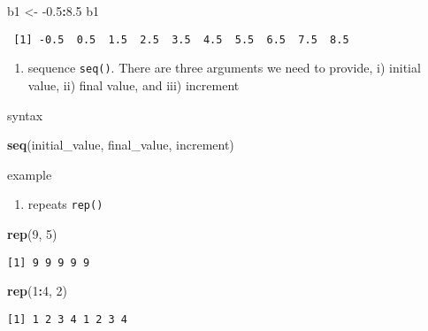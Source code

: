 \documentclass[
]{book}
\newenvironment{Shaded}{\begin{snugshade}}{\end{snugshade}}
\newcommand{\DecValTok}[1]{\textcolor[rgb]{0.00,0.00,0.81}{#1}}
\newcommand{\FloatTok}[1]{\textcolor[rgb]{0.00,0.00,0.81}{#1}}
\newcommand{\KeywordTok}[1]{\textcolor[rgb]{0.13,0.29,0.53}{\textbf{#1}}}
\newcommand{\NormalTok}[1]{#1}
\newcommand{\OperatorTok}[1]{\textcolor[rgb]{0.81,0.36,0.00}{\textbf{#1}}}
\newcommand{\StringTok}[1]{\textcolor[rgb]{0.31,0.60,0.02}{#1}}
\providecommand{\tightlist}{%
  \setlength{\itemsep}{0pt}\setlength{\parskip}{0pt}}
\begin{document}
\begin{Shaded}
\begin{Highlighting}[]
\NormalTok{b1 <-}\StringTok{ }\FloatTok{-0.5}\OperatorTok{:}\FloatTok{8.5}
\NormalTok{b1}
\end{Highlighting}
\end{Shaded}

\begin{verbatim}
 [1] -0.5  0.5  1.5  2.5  3.5  4.5  5.5  6.5  7.5  8.5
\end{verbatim}

\begin{enumerate}
\def\labelenumi{\arabic{enumi}.}
\setcounter{enumi}{1}
\tightlist
\item
  sequence \texttt{seq()}. There are three arguments we need to provide, i) initial value, ii) final value, and iii) increment
\end{enumerate}

syntax

\begin{Shaded}
\begin{Highlighting}[]
\KeywordTok{seq}\NormalTok{(initial_value, final_value, increment)}
\end{Highlighting}
\end{Shaded}

example

\begin{enumerate}
\def\labelenumi{\arabic{enumi}.}
\setcounter{enumi}{2}
\tightlist
\item
  repeats \texttt{rep()}
\end{enumerate}

\begin{Shaded}
\begin{Highlighting}[]
\KeywordTok{rep}\NormalTok{(}\DecValTok{9}\NormalTok{, }\DecValTok{5}\NormalTok{)}
\end{Highlighting}
\end{Shaded}

\begin{verbatim}
[1] 9 9 9 9 9
\end{verbatim}

\begin{Shaded}
\begin{Highlighting}[]
\KeywordTok{rep}\NormalTok{(}\DecValTok{1}\OperatorTok{:}\DecValTok{4}\NormalTok{, }\DecValTok{2}\NormalTok{)}
\end{Highlighting}
\end{Shaded}

\begin{verbatim}
[1] 1 2 3 4 1 2 3 4
\end{verbatim}
\end{document}
